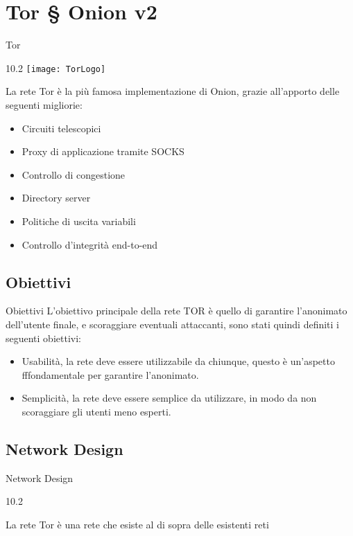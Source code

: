 \section{Tor § Onion v2}
\begin{frame}{Tor}
    \begin{wrapfigure}{1}{0.2\textwidth}
        \centering
        \texttt{[image: TorLogo]}
    \end{wrapfigure}

    La rete Tor è la più famosa implementazione di Onion, grazie all'apporto delle seguenti migliorie:
    \begin{itemize}
        \item Circuiti telescopici
        \item Proxy di applicazione tramite SOCKS
        \item Controllo di congestione
        \item Directory server
        \item Politiche di uscita variabili
        \item Controllo d'integrità end-to-end
    \end{itemize}
\end{frame}

\subsection{Obiettivi}
\begin{frame}{Obiettivi}
    L'obiettivo principale della rete TOR è quello di garantire l'anonimato dell'utente finale, e scoraggiare eventuali attaccanti, sono stati quindi definiti i seguenti obiettivi:
    \begin{itemize}
        \item Usabilità, la rete deve essere utilizzabile da chiunque, questo è un'aspetto fffondamentale per garantire l'anonimato.
        \item Semplicità, la rete deve essere semplice da utilizzare, in modo da non scoraggiare gli utenti meno esperti.
    \end{itemize}
\end{frame}

\subsection{Network Design}
\begin{frame}{Network Design}
    \begin{wrapfigure}{1}{0.2\textwidth}
        \centering
        
    \end{wrapfigure}

    La rete Tor è una rete che esiste al di sopra delle esistenti reti
\end{frame}
